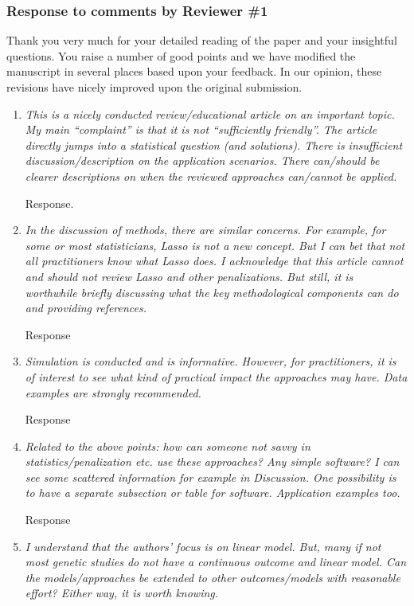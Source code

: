 \documentclass{article}
\begin{document}
\subsubsection*{Response to comments by Reviewer \#1}

Thank you very much for your detailed reading of the paper and your insightful questions. You raise a number of good points and we have modified the manuscript in several places based upon your feedback.  In our opinion, these revisions have nicely improved upon the original submission.

\begin{enumerate}

\item \emph{This is a nicely conducted review/educational article on an important topic. My main ``complaint'' is that it is not ``sufficiently friendly''.  The article directly jumps into a statistical question (and solutions). There is insufficient discussion/description on the application scenarios. There can/should be clearer descriptions on when the reviewed approaches can/cannot be applied.}

  Response.

\item \emph{In the discussion of methods, there are similar concerns. For example, for some or most statisticians, Lasso is not a new concept. But I can bet that not all practitioners know what Lasso does. I acknowledge that this article cannot and should not review Lasso and other penalizations. But still, it is worthwhile briefly discussing what the key methodological components can do and providing references.}

  Response

\item \emph{Simulation is conducted and is informative. However, for practitioners, it is of interest to see what kind of practical impact the approaches may have. Data examples are strongly recommended.}

  Response

\item \emph{Related to the above points: how can someone not savvy in statistics/penalization etc. use these approaches? Any simple software? I can see some scattered information for example in Discussion. One possibility is to have a separate subsection or table for software. Application examples too.}

  Response

\item \emph{I understand that the authors’ focus is on linear model. But, many if not most genetic studies do not have a continuous outcome and linear model. Can the models/approaches be extended to other outcomes/models with reasonable effort? Either way, it is worth knowing.}


\end{enumerate}
\end{document}
